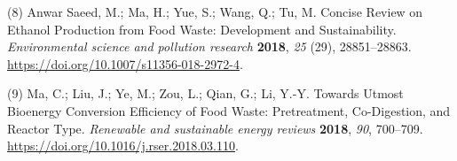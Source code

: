 \documentclass[11pt]{article}
\begin{document}
\hypertarget{citeproc_bib_item_8}{(8) Anwar Saeed, M.; Ma, H.; Yue, S.; Wang, Q.; Tu, M. Concise Review on Ethanol Production from Food Waste: Development and Sustainability. \textit{Environmental science and pollution research} \textbf{2018}, \textit{25} (29), 28851–28863. \url{https://doi.org/10.1007/s11356-018-2972-4}.}

\hypertarget{citeproc_bib_item_9}{(9) Ma, C.; Liu, J.; Ye, M.; Zou, L.; Qian, G.; Li, Y.-Y. Towards Utmost Bioenergy Conversion Efficiency of Food Waste: Pretreatment, Co-Digestion, and Reactor Type. \textit{Renewable and sustainable energy reviews} \textbf{2018}, \textit{90}, 700–709. \url{https://doi.org/10.1016/j.rser.2018.03.110}.}\bigskip
\end{document}
